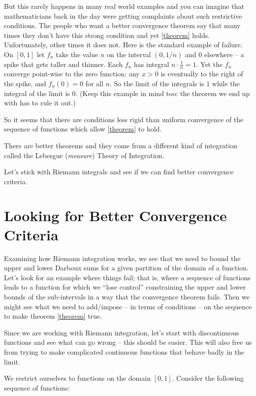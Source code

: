 \documentclass{article}
\begin{document}
But this rarely happens in many real world examples and you can imagine that
mathematicians back in the day
were getting complaints about such restrictive 
conditions. The people who want a better convergence theorem say that many 
times they don't have this strong condition and yet \eqref{theorem}
holds. Unfortunately, other times it does not. Here is the standard example
of failure. On $[0,1]$ let $f_n$ take the value $n$ on the interval
$(0, 1/n)$ and $0$ elsewhere -- a spike that gets taller and thinner. Each
$f_n$ has integral $n \cdot \frac{1}{n} = 1$. Yet the $f_n$ converge
point-wise to the zero function: any $x > 0$ is eventually to the right of
the spike, and $f_n(0) = 0$ for all $n$. So the limit of the integrals is
$1$ while the integral of the limit is $0$. (Keep this example in mind too:
the theorem we end up with has to rule it out.)

So it seems that there are 
conditions less rigid than uniform convergence of the sequence of 
functions which allow \eqref{theorem} to hold.

There are better theorems and they come from a different kind of integration called 
the Lebesgue ({\em measure\/}) Theory of Integration.

Let's stick with Riemann integrals and see if we can find better convergence
criteria.

\section{Looking for Better Convergence Criteria}
Examining how Riemann integration works, we see that we need to bound the upper 
and lower Darboux sums for a given partition of the domain of a function. 
Let's look for an example where things fail; that is, where 
a sequence of functions leads to a function for which we ``lose control'' 
constraining the upper and lower bounds of the sub-intervals in a way that the 
convergence theorem fails. Then we might see what we need to add/impose 
-- in terms of conditions -- on the sequence to make theorem 
\eqref{theorem} true.

Since we are working with Riemann integration,
let's start with discontinuous functions
and see what can go wrong -- this should be easier. This will also free us from 
trying to make complicated continuous functions that behave badly in the limit.

We restrict ourselves to functions on the domain $[0, 1]$.
Consider the following sequence of functions: 
\end{document}

